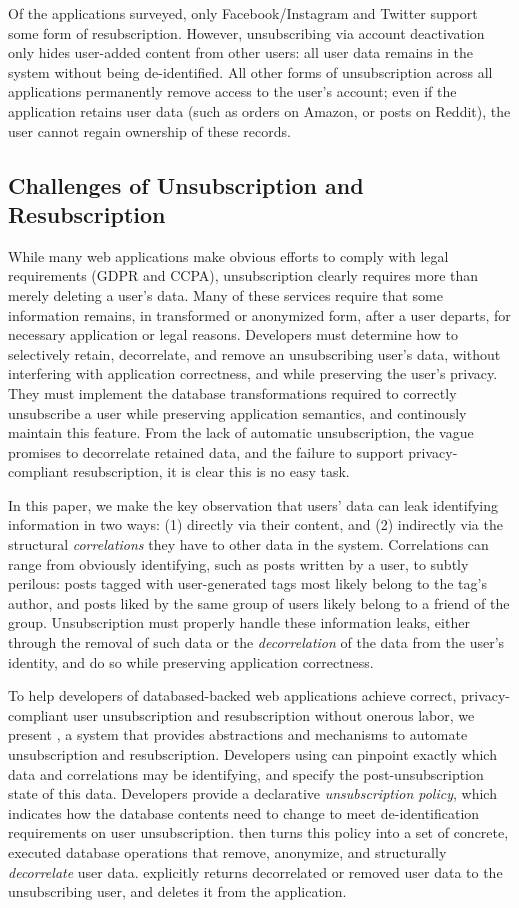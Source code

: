 Of the applications surveyed, only Facebook/Instagram and Twitter support some form of
resubscription. However, unsubscribing via account deactivation only hides user-added content from
other users: all user data remains in the system without being de-identified.  All other forms of
unsubscription across all applications permanently remove access to the user's account; even if the
application retains user data (such as orders on Amazon, or posts on Reddit), the user cannot regain
ownership of these records.

\subsection{Challenges of Unsubscription and Resubscription}
While many web applications make obvious efforts to comply with legal requirements (GDPR and CCPA),
unsubscription clearly requires more than merely deleting a user's data. Many of these services
require that some information remains, in transformed or anonymized form, after a user departs, for
necessary application or legal reasons. 
%
Developers must determine how to selectively retain, decorrelate, and remove an unsubscribing user's data,
without interfering with application correctness, and while preserving the user's privacy. They must 
implement the database transformations required to correctly unsubscribe a user while
preserving application semantics, and continously maintain this feature. 
%
From the lack of automatic unsubscription, the vague promises to decorrelate retained data, and the
failure to support privacy-compliant resubscription, it is clear this is no easy task.
%

In this paper, we make the key observation that users' data can leak identifying information
in two ways: (1) directly via their content, and (2) indirectly via the structural
\emph{correlations} they have to other data in the system. Correlations can range from obviously
identifying, such as posts written by a user, to subtly perilous: posts tagged with user-generated
tags most likely belong to the tag's author, and posts liked by the same group of users likely
belong to a friend of the group.
Unsubscription must properly handle these information leaks, either through the removal of such data or
the \emph{decorrelation} of the data from the user's identity, and do so while preserving
application correctness.

%
To help developers of databased-backed web applications achieve correct, privacy-compliant user
unsubscription and resubscription without onerous labor, we present \sys, a system that provides
abstractions and mechanisms to automate unsubscription and resubscription.
%
Developers using \sys can pinpoint exactly which data and correlations may be identifying, and
specify the post-unsubscription state of this data. Developers provide a declarative
\emph{unsubscription policy}, which indicates how the database contents need to change to meet
de-identification requirements on user unsubscription.
%
\sys then turns this policy into a set of concrete, executed database operations that remove,
anonymize, and structurally \emph{decorrelate} user data. \sys explicitly returns decorrelated or
removed user data to the unsubscribing user, and deletes it from the application.
%

